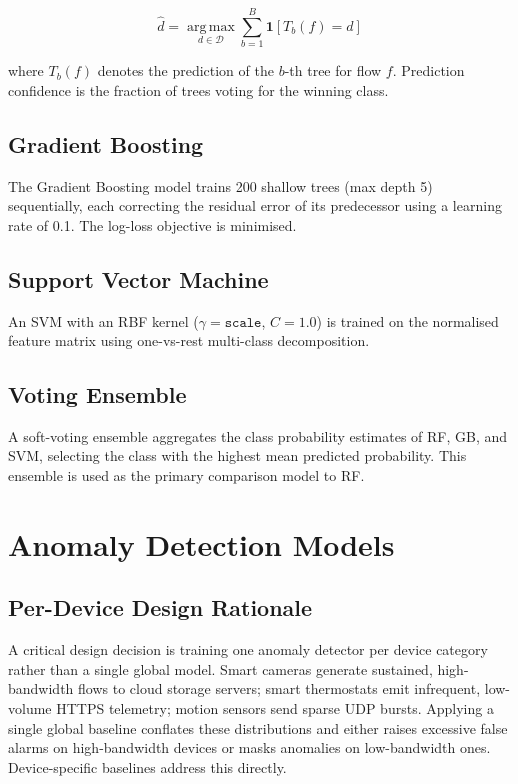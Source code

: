 \documentclass[conference]{IEEEtran}
\begin{document}
\begin{equation}
    \hat{d} = \operatorname*{arg\,max}_{d \in \mathcal{D}}
              \sum_{b=1}^{B} \mathbf{1}\!\left[T_b(f) = d\right]
    \label{eq:rf}
\end{equation}

where $T_b(f)$ denotes the prediction of the $b$-th tree for flow $f$.
Prediction confidence is the fraction of trees voting for the winning class.

\subsection{Gradient Boosting}

The Gradient Boosting model \cite{friedman2001greedy} trains 200 shallow
trees (max depth 5) sequentially, each correcting the residual error of its
predecessor using a learning rate of 0.1. The log-loss objective is minimised.

\subsection{Support Vector Machine}

An SVM \cite{cortes1995support} with an RBF kernel
($\gamma = \texttt{scale}$, $C = 1.0$) is trained on the normalised feature
matrix using one-vs-rest multi-class decomposition.

\subsection{Voting Ensemble}

A soft-voting ensemble aggregates the class probability estimates of RF, GB,
and SVM, selecting the class with the highest mean predicted probability.
This ensemble is used as the primary comparison model to RF.

\section{Anomaly Detection Models}
\label{sec:anomaly}

\subsection{Per-Device Design Rationale}

A critical design decision is training one anomaly detector per device
category rather than a single global model. Smart cameras generate sustained,
high-bandwidth flows to cloud storage servers; smart thermostats emit
infrequent, low-volume HTTPS telemetry; motion sensors send sparse UDP
bursts. Applying a single global baseline conflates these distributions and
either raises excessive false alarms on high-bandwidth devices or masks
anomalies on low-bandwidth ones. Device-specific baselines address this
directly.
\end{document}
